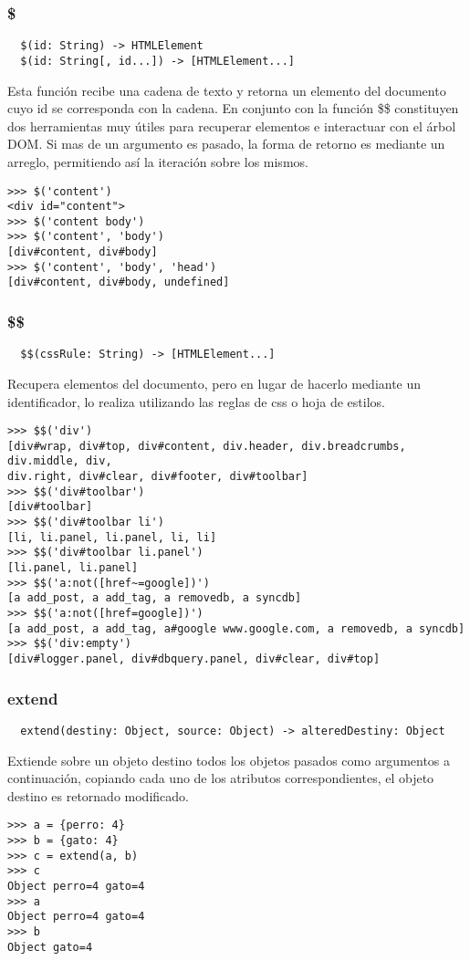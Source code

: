 \subsubsection*{\$}
\begin{verbatim}
  $(id: String) -> HTMLElement
  $(id: String[, id...]) -> [HTMLElement...]
\end{verbatim}
Esta función recibe una cadena de texto y retorna un elemento del documento cuyo
id se corresponda con la cadena. En conjunto con la función \$\$ constituyen dos
herramientas muy útiles para recuperar elementos e interactuar con el árbol DOM.
Si mas de un argumento es pasado, la forma de retorno es mediante un arreglo,
permitiendo así la iteración sobre los mismos.
\begin{lstlisting}[style=consola]
>>> $('content')
<div id="content">
>>> $('content body')
>>> $('content', 'body')
[div#content, div#body]
>>> $('content', 'body', 'head')
[div#content, div#body, undefined]
\end{lstlisting}

\subsubsection*{\$\$}
\begin{verbatim}
  $$(cssRule: String) -> [HTMLElement...]
\end{verbatim}
Recupera elementos del documento, pero en lugar de hacerlo mediante un
identificador, lo realiza utilizando las reglas de css o hoja de estilos.
\begin{lstlisting}[style=consola]
>>> $$('div')
[div#wrap, div#top, div#content, div.header, div.breadcrumbs, div.middle, div,
div.right, div#clear, div#footer, div#toolbar]
>>> $$('div#toolbar')
[div#toolbar]
>>> $$('div#toolbar li')
[li, li.panel, li.panel, li, li]
>>> $$('div#toolbar li.panel')
[li.panel, li.panel]
>>> $$('a:not([href~=google])')
[a add_post, a add_tag, a removedb, a syncdb]
>>> $$('a:not([href=google])')
[a add_post, a add_tag, a#google www.google.com, a removedb, a syncdb]
>>> $$('div:empty')
[div#logger.panel, div#dbquery.panel, div#clear, div#top]
\end{lstlisting}

\subsubsection*{extend}
\begin{verbatim}
  extend(destiny: Object, source: Object) -> alteredDestiny: Object
\end{verbatim}
Extiende sobre un objeto destino todos los objetos pasados como argumentos a
continuación, copiando cada uno de los atributos correspondientes, el objeto
destino es retornado modificado.
\begin{lstlisting}[style=consola]
>>> a = {perro: 4}
>>> b = {gato: 4}
>>> c = extend(a, b)
>>> c
Object perro=4 gato=4
>>> a
Object perro=4 gato=4
>>> b
Object gato=4
\end{lstlisting}

